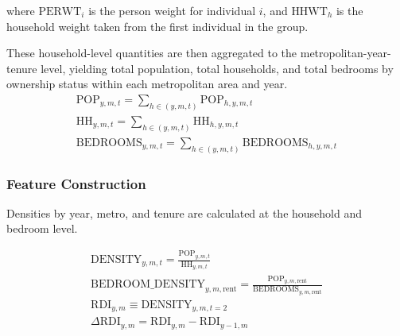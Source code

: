 \documentclass[pdflatex,sn-apa]{sn-jnl}%
\theoremstyle{thmstyleone}%
\theoremstyle{thmstyletwo}%
\theoremstyle{thmstylethree}%
\begin{document}
where \( \text{PERWT}_i \) is the person weight for individual \( i \), and \( \text{HHWT}_{h} \) is the household weight taken from the first individual in the group.

These household-level quantities are then aggregated to the metropolitan-year-tenure level, yielding total population, total households, and total bedrooms by ownership status within each metropolitan area and year.
\begin{align}
	\text{POP}_{y,m,t} = \sum_{h \in (y,m,t)} \text{POP}_{h,y,m,t}\\
	\text{HH}_{y,m,t} = \sum_{h \in (y,m,t)} \text{HH}_{h,y,m,t}\\
	\text{BEDROOMS}_{y,m,t} = \sum_{h \in (y,m,t)} \text{BEDROOMS}_{h,y,m,t}
\end{align}

\subsubsection{Feature Construction}
Densities by year, metro, and tenure are calculated at the household and bedroom level.

\begin{align}
\text{DENSITY}_{y,m,t} = \frac{\text{POP}_{y,m,t}}{\text{HH}_{y,m,t}}\\
\text{BEDROOM\_DENSITY}_{y,m,\text{rent}} =
\frac{\text{POP}_{y,m,\text{rent}}}{\text{BEDROOMS}_{y,m,\text{rent}}}\\
\text{RDI}_{y,m} \equiv \text{DENSITY}_{y,m,t=2} \\
\Delta \text{RDI}_{y,m} = \text{RDI}_{y,m} - \text{RDI}_{y-1,m}
\end{align}





\end{document}
